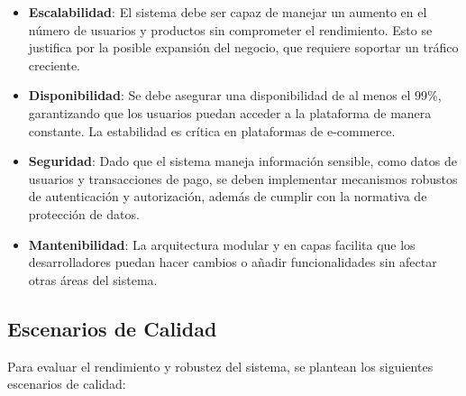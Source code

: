 \documentclass[12pt]{article}
\begin{document}
\begin{itemize}
    \item \textbf{Escalabilidad}: El sistema debe ser capaz de manejar un aumento en el número de usuarios y productos sin comprometer el rendimiento. Esto se justifica por la posible expansión del negocio, que requiere soportar un tráfico creciente.
    \item \textbf{Disponibilidad}: Se debe asegurar una disponibilidad de al menos el 99\%, garantizando que los usuarios puedan acceder a la plataforma de manera constante. La estabilidad es crítica en plataformas de e-commerce.
    \item \textbf{Seguridad}: Dado que el sistema maneja información sensible, como datos de usuarios y transacciones de pago, se deben implementar mecanismos robustos de autenticación y autorización, además de cumplir con la normativa de protección de datos.
    \item \textbf{Mantenibilidad}: La arquitectura modular y en capas facilita que los desarrolladores puedan hacer cambios o añadir funcionalidades sin afectar otras áreas del sistema.
\end{itemize}

\subsection{Escenarios de Calidad}
Para evaluar el rendimiento y robustez del sistema, se plantean los siguientes escenarios de calidad:
\end{document}
